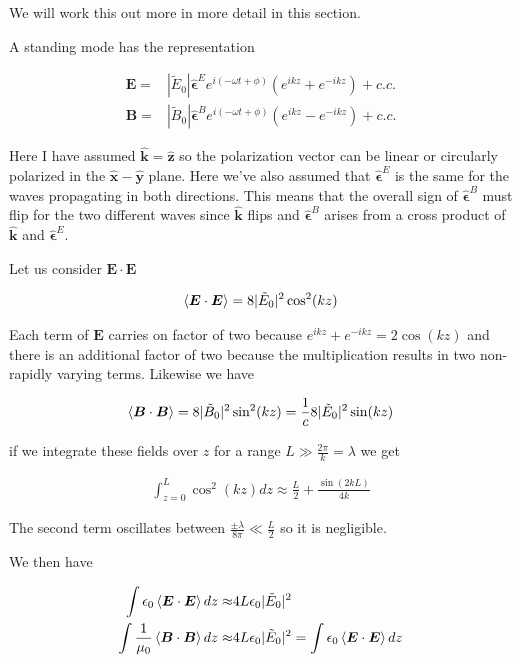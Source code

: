 \documentclass[12pt]{article}
\newcommand{\ep}{\epsilon}
\renewcommand{\vec}[1]{\boldsymbol{#1}}
\newcommand{\unitvec}[1]{\hat{\boldsymbol{#1}}}
\begin{document}
We will work this out more in more detail in this section.

A standing mode has the representation

\begin{align}
\vec{E} =& |\tilde{E}_0| \unitvec{\ep}^E e^{i(-\omega t +\phi)}\left(e^{ikz} + e^{-ikz}\right) + c.c.\\
\vec{B} =& |\tilde{B}_0| \unitvec{\ep}^B e^{i(-\omega t +\phi)}\left(e^{ikz} - e^{-ikz}\right) + c.c.
\end{align}

Here I have assumed $\unitvec{k}=\unitvec{z}$ so the polarization vector can be linear or circularly polarized in the $\unitvec{x}-\unitvec{y}$ plane.
Here we've also assumed that $\unitvec{\ep}^E$ is the same for the waves propagating in both directions.
This means that the overall sign of $\unitvec{\ep}^B$ must flip for the two different waves since $\unitvec{k}$ flips and $\unitvec{\ep}^B$ arises from a cross product of $\unitvec{k}$ and $\unitvec{\ep}^E$.

Let us consider $\vec{E}\cdot\vec{E}$

\begin{align}
\Braket{\vec{E}\cdot\vec{E}} = 8|\tilde{E}_0|^2\cos^2(kz)
\end{align}

Each term of $\vec{E}$ carries on factor of two because $e^{ikz} + e^{-ikz} = 2\cos(kz)$ and there is an additional factor of two because the multiplication results in two non-rapidly varying terms.
Likewise we have

\begin{align}
\Braket{\vec{B}\cdot\vec{B}} = 8|\tilde{B}_0|^2\sin^2(kz) = \frac{1}{c}8|\tilde{E}_0|^2\sin(kz)
\end{align}

if we integrate these fields over $z$ for a range $L \gg \frac{2\pi}{k} = \lambda$ we get

\begin{align}
\int_{z=0}^L \cos^2(kz) dz \approx \frac{L}{2} + \frac{\sin(2kL)}{4k}
\end{align}

The second term oscillates between $\frac{\pm \lambda}{8\pi} \ll \frac{L}{2}$ so it is negligible.

We then have 

\begin{align}
\int \ep_0\Braket{\vec{E}\cdot\vec{E}} dz \approx& 4L \ep_0|\tilde{E}_0|^2\\
\int \frac{1}{\mu_0} \Braket{\vec{B}\cdot\vec{B}} dz \approx& 4L \ep_0 |\tilde{E}_0|^2 = \int \ep_0\Braket{\vec{E}\cdot\vec{E}}dz\\
\end{align}
\end{document}
